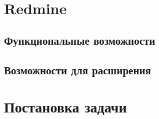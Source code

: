 \section{Redmine}


\subsection{Функциональные возможности}
% 

\subsection{Возможности для расширения}



\section{Постановка задачи}



